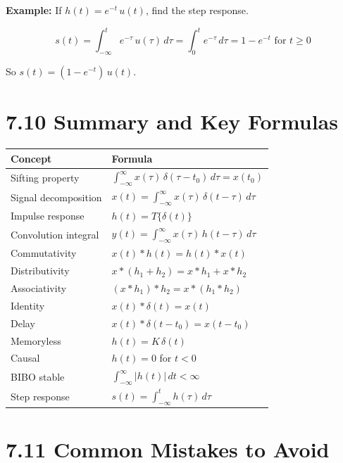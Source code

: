 \documentclass[11pt]{article}
\begin{document}
\textbf{Example:} If $h(t) = e^{-t}\,u(t)$, find the step response.

\[s(t) = \int_{-\infty}^{t} e^{-\tau}\,u(\tau)\,d\tau = \int_0^t e^{-\tau}\,d\tau = 1 - e^{-t}\text{ for } t\geq 0\]

So $s(t) = (1 - e^{-t})\,u(t)$.

\section*{7.10 Summary and Key Formulas}

\begin{center}
\begin{tabular}{|l|l|}
\hline
\textbf{Concept} & \textbf{Formula} \\
\hline
Sifting property & $\int_{-\infty}^{\infty} x(\tau)\,\delta(\tau-t_0)\,d\tau = x(t_0)$ \\
\hline
Signal decomposition & $x(t) = \int_{-\infty}^{\infty} x(\tau)\,\delta(t-\tau)\,d\tau$ \\
\hline
Impulse response & $h(t) = T\{\delta(t)\}$ \\
\hline
Convolution integral & $y(t) = \int_{-\infty}^{\infty} x(\tau)\,h(t-\tau)\,d\tau$ \\
\hline
Commutativity & $x(t)*h(t) = h(t)*x(t)$ \\
\hline
Distributivity & $x*(h_1 + h_2) = x*h_1 + x*h_2$ \\
\hline
Associativity & $(x*h_1)*h_2 = x*(h_1*h_2)$ \\
\hline
Identity & $x(t)*\delta(t) = x(t)$ \\
\hline
Delay & $x(t)*\delta(t-t_0) = x(t-t_0)$ \\
\hline
Memoryless & $h(t) = K\,\delta(t)$ \\
\hline
Causal & $h(t) = 0$ for $t<0$ \\
\hline
BIBO stable & $\int_{-\infty}^{\infty} |h(t)|\,dt < \infty$ \\
\hline
Step response & $s(t) = \int_{-\infty}^{t} h(\tau)\,d\tau$ \\
\hline
\end{tabular}
\end{center}

\section*{7.11 Common Mistakes to Avoid}
\end{document}
